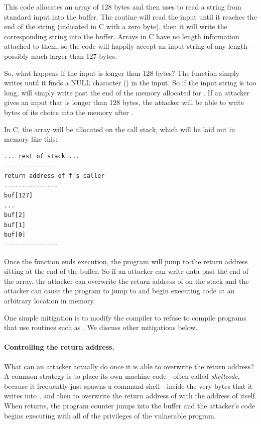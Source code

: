 This code allocates an array of 128 bytes and then uses  to
read a string from standard input into the buffer.
The  routine will read the input until it reaches the
end of the string (indicated in C with a zero byte), then it will
write the corresponding string into the buffer.
Arrays in C have no length information attached to them, so the 
code will happily accept an input string of any length---possibly much larger
than 127 bytes.

So, what happens if the input is 
longer than 128 bytes? The  function simply writes until
it finds a NULL character () in the input. 
So if the input string is too long,  will simply write past
the end of the memory allocated for . 
If an attacker gives an input that is longer than 128 bytes,
the attacker will be able to write bytes of its choice into the 
memory after .

In C, the  array will be allocated on the call stack, which will be
laid out in memory like this:
\begin{verbatim}
... rest of stack ...
---------------
return address of f's caller
---------------
buf[127]
...
buf[2]
buf[1]
buf[0]
---------------
\end{verbatim}

Once the  function ends execution, the program will jump to the
return address sitting at the end of the buffer.
So if an attacker can write data past the end of the  array, 
the attacker can overwrite the return address of  on the stack
and the attacker can cause the program to jump to and begin executing
code at an arbitrary location in memory.

One simple mitigation is to 
modify the compiler to refuse to compile programs that use 
routines such as .
We discuss other mitigations below.

\paragraph{Controlling the return address.}
What can an attacker actually do once it is able to overwrite the return
address? A common strategy is to place its own machine code---often
called \emph{shellcode}, because it frequently just spawns a command
shell---inside the very bytes that it writes into , and then to
overwrite the return address of  with the address of 
itself. When  returns, the program counter jumps into the buffer
and the attacker's code begins executing with all of the privileges of
the vulnerable program.


